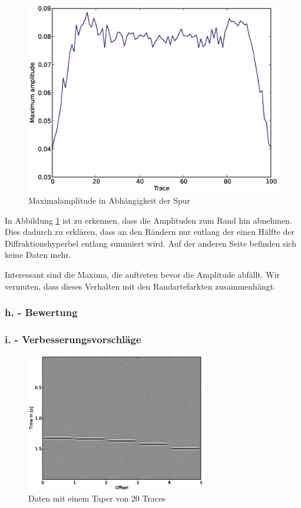 \documentclass[12pt,a4paper]{scrartcl}
\begin{document}
\begin{figure}[htb]
\centering
\includegraphics[width=1\textwidth]{amplitudes}
\caption{Maximalamplitude in Abhängigkeit der Spur}
\label{amplitudes}
\end{figure}

In Abbildung \ref{amplitudes} ist zu erkennen, dass die Amplituden zum Rand hin abnehmen. 
Dies dadurch zu erklären, dass an den Rändern nur entlang der einen Hälfte der Diffraktionshyperbel entlang summiert wird. Auf der anderen Seite befinden sich keine Daten mehr.

Interessant sind die Maxima, die auftreten bevor die Amplitude abfällt. Wir vermuten, dass dieses Verhalten mit den Randartefarkten zusammenhängt.

\subsubsection*{h. - Bewertung}



\subsubsection*{i. - Verbesserungsvorschläge}



\begin{figure}[htb]
\centering
\includegraphics[width=0.7\textwidth]{tapered_data}
\caption{Daten mit einem Taper von 20 Traces}
\label{tapered_data}
\end{figure}
\end{document}
